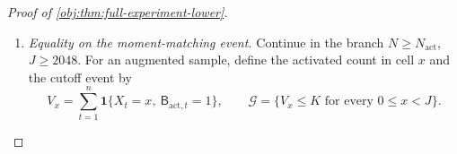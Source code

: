 \documentclass[11pt]{article}
\begin{document}
\begin{proof}[Proof of \cref{obj:thm:full-experiment-lower}]
\begin{enumerate}
For \(\iota\in\{0,1\}\), draw
\[
\mathbf Z=(Z_x)_{x=0}^{d-1}\sim\Pi_\iota^{\otimes d}
\]
once for the entire sample. Define the observed mixture law
\[
Q_{\mathrm{act},\iota}
=\int_{[1,H]^d}
\mathcal L_{P_{\mathrm{act},\mathbf z}}(\mathbf O_n)\,
d\Pi_\iota^{\otimes d}(\mathbf z),
\]
and let \(\widetilde Q_{\mathrm{act},\iota}\) be the corresponding augmented
law constructed in \cref{obj:def:activation-lower-handle}. Thus
\[
\widetilde Q_{\mathrm{act},\iota}
=
\int_{[1,H]^d}
\mathcal L\!\left(
(\mathsf B_{\mathrm{act},t},O_t)_{t=1}^{n}
\,\middle|\,\mathbf Z=\mathbf z\right)
d\Pi_\iota^{\otimes d}(\mathbf z).
\]
The activation flags have probability \(qH\), independently of the latent
vector and the baseline and treatment pattern.

At the record level, forgetting the flag gives the following probabilities
for the three marks \((R,RY)=(1,1),(1,0),(0,0)\):
\[
\begin{array}{c|ccc}
& (1,1)&(1,0)&(0,0)\\ \hline
A=1,\ X=x<J&q&q(z_x-1)&1-qz_x\\
A=0,\ X=x<J&0&qz_x&1-qz_x\\
X\ge J&0&qH&1-qH
\end{array}
\]
These are exactly the probabilities induced by \(P_{\mathrm{act},\mathbf z}\).
Define the forgetting map by
\[
\operatorname{pr}_{\mathrm{obs}}
\bigl((\mathsf B_{\mathrm{act},t},O_t)_{t=1}^{n}\bigr)
=(O_t)_{t=1}^{n}.
\]
Conditional independence of the records and integration over the common
latent vector therefore give
\[
Q_{\mathrm{act},\iota}
=\widetilde Q_{\mathrm{act},\iota}
\circ\operatorname{pr}_{\mathrm{obs}}^{-1}.
\]

\item \emph{Equality on the moment-matching event.}
Continue in the branch \(N\ge N_{\mathrm{act}}\), \(J\ge2048\).
For an augmented sample, define the activated count in cell \(x\) and the
cutoff event by
\[
V_x=\sum_{t=1}^{n}
\mathbf1\{X_t=x,\ \mathsf B_{\mathrm{act},t}=1\},
\qquad
\mathcal G=\{V_x\le K\text{ for every }0\le x<J\}.
\]


\end{enumerate}
\end{proof}
\end{document}
